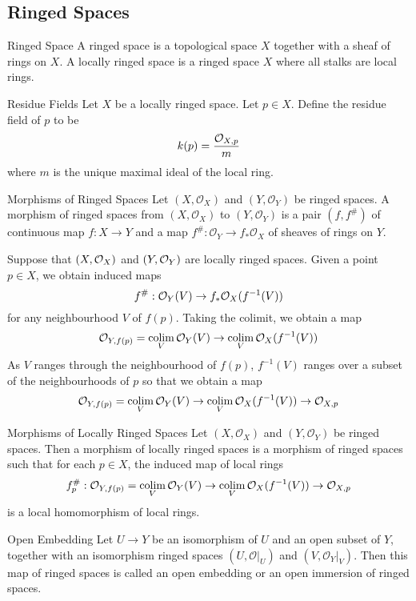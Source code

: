 \documentclass[a4paper]{article}
\begin{document}
\subsection{Ringed Spaces}
\begin{defn}{Ringed Space}{} A ringed space is a topological space $X$ together with a sheaf of rings on $X$. A locally ringed space is a ringed space $X$ where all stalks are local rings. 
\end{defn}

\begin{defn}{Residue Fields}{} Let $X$ be a locally ringed space. Let $p\in X$. Define the residue field of $p$ to be $$k(p)=\frac{\mathcal{O}_{X,p}}{m}$$ where $m$ is the unique maximal ideal of the local ring. 
\end{defn}

\begin{defn}{Morphisms of Ringed Spaces}{} Let $(X,\mathcal{O}_X)$ and $(Y,\mathcal{O}_Y)$ be ringed spaces. A morphism of ringed spaces from $(X,\mathcal{O}_X)$ to $(Y,\mathcal{O}_Y)$ is a pair $(f,f^\#)$ of continuous map $f:X\to Y$ and a map $f^\#:\mathcal{O}_Y\to f_\ast\mathcal{O}_X$ of sheaves of rings on $Y$. 
\end{defn}

Suppose that $(X,\mathcal{O}_X)$ and $(Y,\mathcal{O}_Y)$ are locally ringed spaces. Given a point $p\in X$, we obtain induced maps $$f^\#:\mathcal{O}_Y(V)\to f_\ast\mathcal{O}_X(f^{-1}(V))$$ for any neighbourhood $V$ of $f(p)$. Taking the colimit, we obtain a map $$\mathcal{O}_{Y,f(p)}=\operatorname*{colim}_V\mathcal{O}_Y(V)\to\operatorname*{colim}_V\mathcal{O}_X(f^{-1}(V))$$ As $V$ ranges through the neighbourhood of $f(p)$, $f^{-1}(V)$ ranges over a subset of the neighbourhoods of $p$ so that we obtain a map $$\mathcal{O}_{Y,f(p)}=\operatorname*{colim}_V\mathcal{O}_Y(V)\to\operatorname*{colim}_V\mathcal{O}_X(f^{-1}(V))\to\mathcal{O}_{X,p}$$

\begin{defn}{Morphisms of Locally Ringed Spaces}{} Let $(X,\mathcal{O}_X)$ and $(Y,\mathcal{O}_Y)$ be ringed spaces. Then a morphism of locally ringed spaces is a morphism of ringed spaces such that for each $p\in X$, the induced map of local rings $$f_p^\#:\mathcal{O}_{Y,f(p)}=\operatorname*{colim}_V\mathcal{O}_Y(V)\to\operatorname*{colim}_V\mathcal{O}_X(f^{-1}(V))\to\mathcal{O}_{X,p}$$ is a local homomorphism of local rings. 
\end{defn}

\begin{defn}{Open Embedding}{} Let $U\to Y$ be an isomorphism of $U$ and an open subset of $Y$, together with an isomorphism ringed spaces $(U,\mathcal{O}|_U)$ and $(V,\mathcal{O}_Y|_V)$. Then this map of ringed spaces is called an open embedding or an open immersion of ringed spaces. 
\end{defn}
\end{document}
